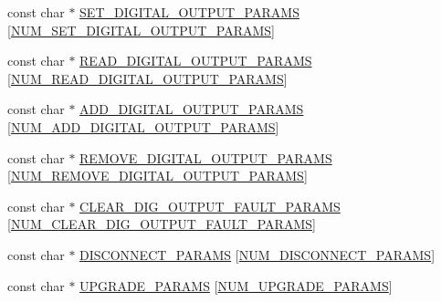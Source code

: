 \begin{DoxyCompactItemize}
\item 
const char $\ast$ \hyperlink{group__command__interpreter_gade511743b3ecf569a2e74c1b14291a5b}{S\-E\-T\-\_\-\-D\-I\-G\-I\-T\-A\-L\-\_\-\-O\-U\-T\-P\-U\-T\-\_\-\-P\-A\-R\-A\-M\-S} \mbox{[}\hyperlink{group__command__interpreter_gaac55dd13b66c6ed14773e930596be11e}{N\-U\-M\-\_\-\-S\-E\-T\-\_\-\-D\-I\-G\-I\-T\-A\-L\-\_\-\-O\-U\-T\-P\-U\-T\-\_\-\-P\-A\-R\-A\-M\-S}\mbox{]}
\item 
const char $\ast$ \hyperlink{group__command__interpreter_ga4f49602cd24e42a37f7509d5fc24ff34}{R\-E\-A\-D\-\_\-\-D\-I\-G\-I\-T\-A\-L\-\_\-\-O\-U\-T\-P\-U\-T\-\_\-\-P\-A\-R\-A\-M\-S} \mbox{[}\hyperlink{group__command__interpreter_ga8e7fef9c50e4a2992d7ac233d7e65510}{N\-U\-M\-\_\-\-R\-E\-A\-D\-\_\-\-D\-I\-G\-I\-T\-A\-L\-\_\-\-O\-U\-T\-P\-U\-T\-\_\-\-P\-A\-R\-A\-M\-S}\mbox{]}
\item 
const char $\ast$ \hyperlink{group__command__interpreter_gaf583eedd117e9397b34163b0ed4791c3}{A\-D\-D\-\_\-\-D\-I\-G\-I\-T\-A\-L\-\_\-\-O\-U\-T\-P\-U\-T\-\_\-\-P\-A\-R\-A\-M\-S} \mbox{[}\hyperlink{group__command__interpreter_gadea8918a215685b1576f95e1fb754778}{N\-U\-M\-\_\-\-A\-D\-D\-\_\-\-D\-I\-G\-I\-T\-A\-L\-\_\-\-O\-U\-T\-P\-U\-T\-\_\-\-P\-A\-R\-A\-M\-S}\mbox{]}
\item 
const char $\ast$ \hyperlink{group__command__interpreter_gab8e88e0e75930f03474e1ff9e232ef63}{R\-E\-M\-O\-V\-E\-\_\-\-D\-I\-G\-I\-T\-A\-L\-\_\-\-O\-U\-T\-P\-U\-T\-\_\-\-P\-A\-R\-A\-M\-S} \mbox{[}\hyperlink{group__command__interpreter_gaab1534ae5702e990bfdc0f8c85094df0}{N\-U\-M\-\_\-\-R\-E\-M\-O\-V\-E\-\_\-\-D\-I\-G\-I\-T\-A\-L\-\_\-\-O\-U\-T\-P\-U\-T\-\_\-\-P\-A\-R\-A\-M\-S}\mbox{]}
\item 
const char $\ast$ \hyperlink{group__command__interpreter_gae3e466b9002fbb2a3b72a14091736c14}{C\-L\-E\-A\-R\-\_\-\-D\-I\-G\-\_\-\-O\-U\-T\-P\-U\-T\-\_\-\-F\-A\-U\-L\-T\-\_\-\-P\-A\-R\-A\-M\-S} \mbox{[}\hyperlink{group__command__interpreter_gaebf261e1faa9877050475c6a01c2f698}{N\-U\-M\-\_\-\-C\-L\-E\-A\-R\-\_\-\-D\-I\-G\-\_\-\-O\-U\-T\-P\-U\-T\-\_\-\-F\-A\-U\-L\-T\-\_\-\-P\-A\-R\-A\-M\-S}\mbox{]}
\item 
const char $\ast$ \hyperlink{group__command__interpreter_ga4c2b766d3384cd7cb0ed759dab8fc4ac}{D\-I\-S\-C\-O\-N\-N\-E\-C\-T\-\_\-\-P\-A\-R\-A\-M\-S} \mbox{[}\hyperlink{group__command__interpreter_gab5824d68d182fb33e2aebc616288f06a}{N\-U\-M\-\_\-\-D\-I\-S\-C\-O\-N\-N\-E\-C\-T\-\_\-\-P\-A\-R\-A\-M\-S}\mbox{]}
\item 
const char $\ast$ \hyperlink{group__command__interpreter_gaf4f7b3cf35167e36d202bb65a02f0b71}{U\-P\-G\-R\-A\-D\-E\-\_\-\-P\-A\-R\-A\-M\-S} \mbox{[}\hyperlink{group__command__interpreter_ga42bcbf56d92ed56e8a88c69e5d4cb4c0}{N\-U\-M\-\_\-\-U\-P\-G\-R\-A\-D\-E\-\_\-\-P\-A\-R\-A\-M\-S}\mbox{]}

\end{DoxyCompactItemize}
